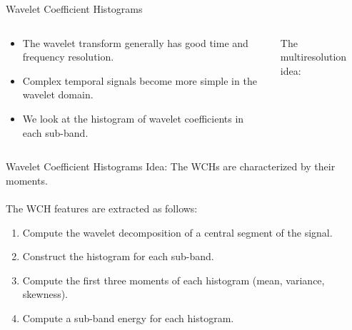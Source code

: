 \documentclass[xcolor=dvipsnames,t]{beamer} %
\begin{document}
\begin{frame}{Wavelet Coefficient Histograms}
   \begin{columns}[T,onlytextwidth]
      \begin{column}{0.45\textwidth}
         \begin{itemize}
            \item The wavelet transform generally has good time and frequency resolution.
            \item Complex temporal signals become more simple in the wavelet domain.
            \item We look at the histogram of wavelet coefficients in each sub-band.
         \end{itemize}

      \end{column}

      \begin{column}{0.45\textwidth}
         The multiresolution idea:\\[1em]
      \end{column}
   \end{columns}
\end{frame}

\begin{frame}{Wavelet Coefficient Histograms}
   Idea: The WCHs are characterized by their moments.\\

   ~\\
   The WCH features are extracted as follows:
   \begin{enumerate}
      \item Compute the wavelet decomposition of a central segment of the signal.
      \item Construct the histogram for each sub-band.
      \item Compute the first three moments of each histogram (mean, variance, skewness).
      \item Compute a sub-band energy for each histogram.
   \end{enumerate}

\end{frame}
\end{document}
